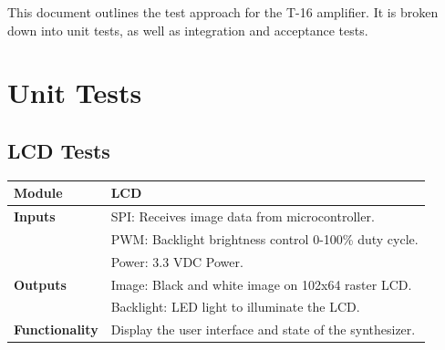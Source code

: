 \documentclass{article}
\begin{document}

This document outlines the test approach for the T-16 amplifier. It is
broken down into unit tests, as well as integration and acceptance
tests.

\section{Unit Tests}
\subsection{LCD Tests}

\begin{tabular}{|p{1in}|p{5in}|}
\hline
\textbf{Module} & LCD \\
\hline
\textbf{Inputs}& SPI: Receives image data from microcontroller.\\
	     & PWM: Backlight brightness control 0-100\% duty cycle.\\
	     & Power: 3.3 VDC Power.\\
\hline
\textbf{Outputs}& Image: Black and white image on 102x64 raster LCD.\\
	      & Backlight: LED light to illuminate the LCD.\\ 
\hline
\textbf{Functionality}& Display the user interface and state of the synthesizer.\\
\hline
\end{tabular}
\end{document}
